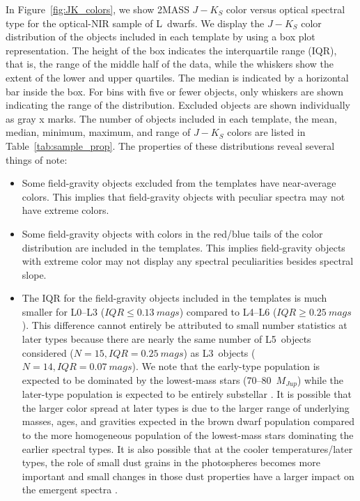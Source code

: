 \documentclass[modern,trackchanges]{aastex61}
\begin{document}
In Figure~\ref{fig:JK_colors}, we show 2MASS $J-K_S$ color versus optical spectral type for the optical-NIR sample of L~dwarfs.
We display the $J-K_S$ color distribution of the objects included in each template by using a box plot representation. The height of the box indicates the interquartile range (IQR), that is, the range of the middle half of the data, while the whiskers show the extent of the lower and upper quartiles. The median is indicated by a horizontal bar inside the box. For bins with five or fewer objects, only whiskers are shown indicating the range of the distribution. Excluded objects are shown individually as gray x marks.
The number of objects included in each template, the mean, median, minimum, maximum, and range of $J-K_S$ colors are listed in Table~\ref{tab:sample_prop}.
The properties of these distributions reveal several things of note:
\begin{itemize}
\item Some field-gravity objects excluded from the templates have near-average colors. This implies that field-gravity objects with peculiar spectra may not have extreme colors.
\item Some field-gravity objects with colors in the red/blue tails of the color distribution are included in the templates. This implies field-gravity objects with extreme color may not display any spectral peculiarities besides spectral slope.
\item The IQR for the field-gravity objects included in the templates is much smaller for L0--L3 ($IQR\le0.13~mags$) compared to L4--L6 ($IQR\ge0.25~mags$).
This difference cannot entirely be attributed to small number statistics at later types because there are nearly the same number of L5~objects considered ($N=15,IQR=0.25~mags$) as L3~objects ($N=14,IQR=0.07~mags$).
We note that the early-type population is expected to be dominated by the lowest-mass stars (70--80~$M_{Jup}$) while the later-type population is expected to be entirely substellar \citep{Burrows01}.
It is possible that the larger color spread at later types is due to the larger range of underlying masses, ages, and gravities expected in the brown dwarf population compared to the more homogeneous population of the lowest-mass stars dominating the earlier spectral types.
It is also possible that at the cooler temperatures/later types, the role of small dust grains in the photospheres becomes more important and small changes in those dust properties have a larger impact on the emergent spectra \citep{Burgasser08_blue,Marocco:2014kr,Hiranaka:2016jm}.
\end{itemize}
\end{document}
